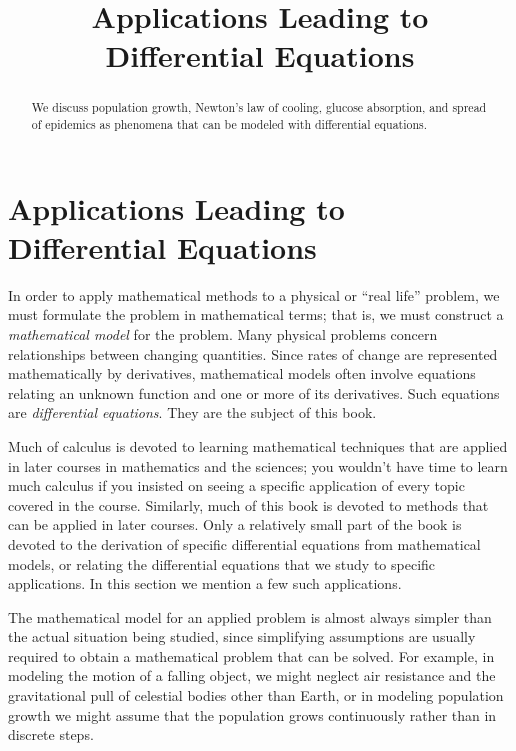 \documentclass{ximera}
\title{Applications Leading to Differential Equations}
\begin{document}

\begin{abstract}
We discuss population growth, Newton's law of cooling, glucose absorption, and spread of epidemics as phenomena that can be modeled with differential equations.
\end{abstract}

\maketitle

\section*{Applications Leading to Differential Equations}

In order to apply mathematical methods to a physical or ``real life''
problem, we must  formulate the problem in mathematical
terms; that is, we must construct a \textit{mathematical
model} for the
problem. Many physical problems concern relationships between changing
quantities. Since rates of change are represented mathematically by
derivatives, mathematical models often involve equations relating an
unknown function and one or more of its derivatives. Such equations
are  \textit{differential equations}. They are the subject of this
book.

Much of calculus is devoted to learning mathematical techniques that
are applied in later courses in mathematics and the sciences;     you
wouldn't have time to learn much calculus if you insisted on seeing
a specific application of every topic covered in the course.
Similarly, much of this book is devoted to methods that can be applied
in later courses. Only a relatively small part of the book is devoted
to the derivation of specific differential equations from mathematical
models, or relating the differential equations that we study to
specific applications. In this section we mention a few such
applications.

The mathematical model for an applied problem is almost always simpler
than the actual situation being studied, since simplifying assumptions
are usually required to obtain a mathematical problem that can be
solved. For example, in modeling the motion of a falling object, we
might neglect air resistance and the gravitational pull of celestial
bodies other than Earth, or in  modeling  population growth we
might assume that the population grows continuously rather than in
discrete steps.
\end{document}

